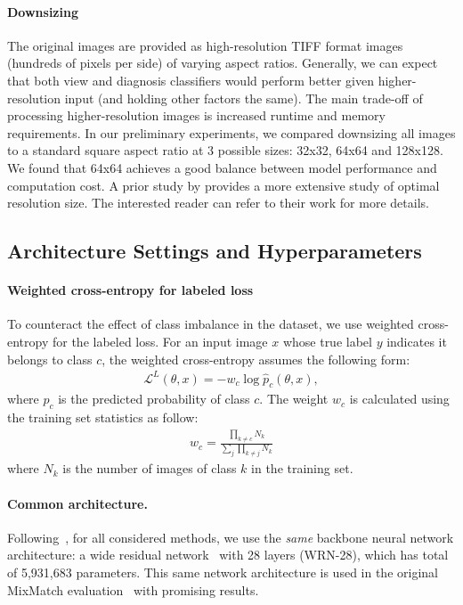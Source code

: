 \paragraph{Downsizing}
The original images are provided as high-resolution TIFF format images (hundreds of pixels per side) of varying aspect ratios. Generally, we can expect that both view and diagnosis classifiers would perform better given higher-resolution input (and holding other factors the same). The main trade-off of processing higher-resolution images is increased runtime and memory requirements. In our preliminary experiments, we compared downsizing all images to a standard square aspect ratio at 3 possible sizes: 32x32, 64x64 and 128x128. We found that 64x64 achieves a good balance between model performance and computation cost. 
A prior study by \citet{madaniDeepEchocardiographyDataefficient2018} provides a more extensive study of optimal resolution size. The interested reader can refer to their work for more details. 


\subsection{Architecture Settings and Hyperparameters}
\label{sec:arch_and_hyperparameters}

\paragraph{Weighted cross-entropy for labeled loss}
To counteract the effect of class imbalance in the dataset, we use weighted cross-entropy for the labeled loss. For an input image $x$ whose true label $y$ indicates it belongs to class $c$, the weighted cross-entropy assumes the following form:
\begin{align}
\mathcal{L}^L(\theta, x) = - w_{c} \log \hat{p}_{c}(\theta, x),
\end{align}
where $\hat{p}_{c}$ is the predicted probability of class $c$. The weight $w_{c}$ is calculated using the training set statistics as follow:
\begin{align}
w_{c} = \frac{\prod_{k\neq c}{N_{k}}}{\sum_{j}\prod_{k \neq j}{N_{k}}}
\end{align}
where $N_{k}$ is the number of images of class $k$ in the training set.

\paragraph{Common architecture.}
Following~\citet{oliverRealisticEvaluationDeep2018}, for all considered methods, we use the \emph{same} backbone neural network architecture: a wide residual network~\citep{zagoruykoWideResidualNetworks2017} with 28 layers (WRN-28), which has total of 5,931,683 parameters.
This same network architecture is used in the original MixMatch evaluation~\citep{berthelotMixmatchHolisticApproach2019} with promising results.

